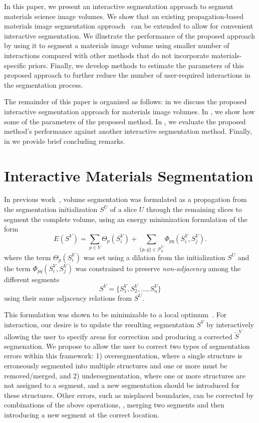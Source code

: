 \documentclass[]{spie}  %
\begin{document}
In this paper, we present an interactive segmentation approach to
segment materials science image volumes.  We show that an existing
propagation-based materials image segmentation
approach~\cite{waggoner:11} can be extended to allow for convenient
interactive segmentation.  We illustrate the performance of the
proposed approach by using it to segment a materials image volume
using smaller number of interactions compared with other methods that
do not incorporate materials-specific priors.  Finally, we develop
methods to estimate the parameters of this proposed approach to
further reduce the number of user-required interactions in the
segmentation process.

The remainder of this paper is organized as follows: in
 we discuss the proposed interactive segmentation
approach for materials image volumes. In , we show how
some of the parameters of the proposed method.  In , we
evaluate the proposed method's performance against another interactive
segmentation method.  Finally, in  we provide brief
concluding remarks.

\section{Interactive Materials Segmentation}
\label{sec:interactive}

In previous work~\cite{waggoner:11}, volume segmentation was
formulated as a propagation from the segmentation initialization $S^U$
of a slice $U$ through the remaining slices to segment the complete
volume, using an energy minimization formulation of the form
\begin{equation}
  E( S^V ) = \sum_{p\in V}\Theta_p(S^V_i) + 
  \sum_{\{p,q\}\in\mathcal{P}^V_n} \Phi_{pq}(S_i^V , S_j^V) .
\label{eq:energy1}
\end{equation}
where the \data{} term $\Theta_p(S^V_i)$ was set using a dilation from
the initialization $S^U$ and the \smooth{} term $\Phi_{pq}(S_i^V ,
S_j^V)$ was constrained to preserve \emph{non-adjacency} among the
different segments
\[S^V = \{ S^V_1, S^V_2, \ldots, S^V_n \} \] using their same
adjacency relations from $S^U$.

This formulation was shown to be minimizable to a local
optimum~\cite{veksler:99, boykov:01}.  For interaction, our desire is
to update the resulting segmentation $S^V$ by interactively allowing
the user to specify areas for correction and producing a corrected
$\tilde{S}^V$ segmenation.  We propose to allow the user to correct two
types of segmentation errors within this framework: 1)
oversegmentation, where a single structure is erroneously segmented
into multiple structures and one or more must be removed/merged, and
2) undersegmentation, where one or more structures are not assigned to
a segment, and a new segmentation should be introduced for these
structures.  Other errors, such as misplaced boundaries, can be
corrected by combinations of the above operations, \eg, merging two
segments and then introducing a new segment at the correct location.
\end{document}

